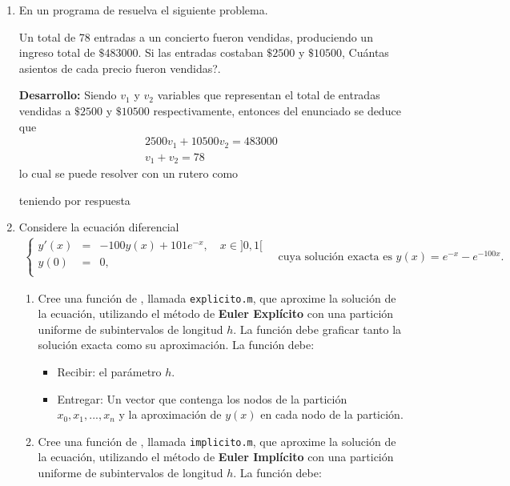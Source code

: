 \documentclass[letter,11pt]{article}
\begin{document}
\begin{enumerate}
\item En un programa de \octave resuelva el siguiente problema.

Un total de 78 entradas a un concierto fueron vendidas, produciendo un ingreso total de $\$483000$. Si las entradas costaban $\$2500$ y $\$10500$, \textquestiondown Cu\'antas asientos de cada precio fueron vendidas?.

\textbf{Desarrollo:} Siendo $v_1$ y $v_2$ variables que representan el total de entradas vendidas a $\$2500$ y $\$10500$ respectivamente, entonces del enunciado se deduce que
$$
\begin{array}{l}
2500v_1+10500v_2=483000\\
v_1+v_2=78
\end{array}
$$
lo cual se puede resolver con un rutero como

teniendo por respuesta


\item Considere la ecuaci\'on diferencial 
\begin{eqnarray*}
\left \{
\begin{array}{rcl}
y'(x)&=&-100y(x) + 101e^{-x}, \quad  x \in ]0,1[\\
y(0)&=&0,\\
\end{array}
\quad \textrm{cuya soluci\'on exacta es $y(x)=e^{-x}-e^{-100x}$.}\right.
\end{eqnarray*}

\begin{enumerate}
\item Cree una funci\'on de \octave, llamada \texttt{explicito.m},  que aproxime la soluci\'on  de la ecuaci\'on, utilizando el m\'etodo de {\bf Euler Expl\'icito} con una partici\'on uniforme de subintervalos de longitud $h$. La funci\'on debe graficar tanto la soluci\'on exacta como su aproximaci\'on. La funci\'on debe:
\begin{itemize}
\item Recibir: el par\'ametro  $h$.
\item Entregar: Un vector que contenga los nodos de la partici\'on $x_0, x_1, ..., x_n$ y la aproximaci\'on de $y(x)$ en cada nodo de la partici\'on.
\end{itemize}


\item Cree una funci\'on de \octave, llamada \texttt{implicito.m},  que aproxime la soluci\'on de la ecuaci\'on, utilizando el m\'etodo de {\bf Euler Impl\'icito} con una partici\'on uniforme de subintervalos de longitud $h$. La funci\'on debe:


\end{enumerate}
\end{enumerate}
\end{document}

